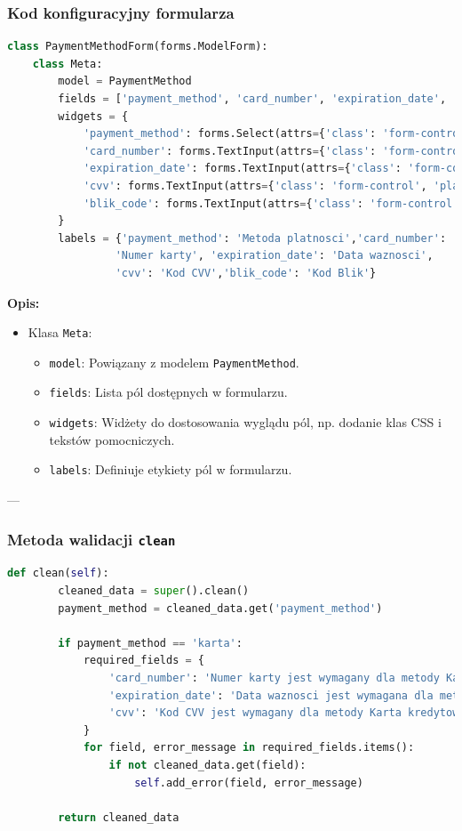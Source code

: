 \documentclass[12pt,a4paper,oneside]{article}
\theoremstyle{definition}
\numberwithin{equation}{section}
\begin{document}
\subsubsection*{Kod konfiguracyjny formularza}
\begin{lstlisting}[language=Python, caption=Konfiguracja formularza]
class PaymentMethodForm(forms.ModelForm):
    class Meta:
        model = PaymentMethod
        fields = ['payment_method', 'card_number', 'expiration_date', 'cvv', 'blik_code']
        widgets = {
            'payment_method': forms.Select(attrs={'class': 'form-control'}),
            'card_number': forms.TextInput(attrs={'class': 'form-control', 'placeholder': 'Wprowadz numer karty'}),
            'expiration_date': forms.TextInput(attrs={'class': 'form-control', 'placeholder': 'MM/RR'}),
            'cvv': forms.TextInput(attrs={'class': 'form-control', 'placeholder': 'CVV'}),
            'blik_code': forms.TextInput(attrs={'class': 'form-control', 'placeholder': 'Kod Blik'}),
        }
        labels = {'payment_method': 'Metoda platnosci','card_number': 
                 'Numer karty', 'expiration_date': 'Data waznosci',
                 'cvv': 'Kod CVV','blik_code': 'Kod Blik'}
\end{lstlisting}

\textbf{Opis:}  
\begin{itemize}
    \item Klasa \texttt{Meta}:
    \begin{itemize}
        \item \texttt{model}: Powiązany z modelem \texttt{PaymentMethod}.
        \item \texttt{fields}: Lista pól dostępnych w formularzu.
        \item \texttt{widgets}: Widżety do dostosowania wyglądu pól, np. dodanie klas CSS i tekstów pomocniczych.
        \item \texttt{labels}: Definiuje etykiety pól w formularzu.
    \end{itemize}
\end{itemize}

---

\subsubsection*{Metoda walidacji \texttt{clean}}
\begin{lstlisting}[language=Python, caption=Metoda walidacji clean w PaymentMethodForm]
    def clean(self):
        cleaned_data = super().clean()
        payment_method = cleaned_data.get('payment_method')

        if payment_method == 'karta':
            required_fields = {
                'card_number': 'Numer karty jest wymagany dla metody Karta kredytowa/debetowa.',
                'expiration_date': 'Data waznosci jest wymagana dla metody Karta kredytowa/debetowa.',
                'cvv': 'Kod CVV jest wymagany dla metody Karta kredytowa/debetowa.',
            }
            for field, error_message in required_fields.items():
                if not cleaned_data.get(field):
                    self.add_error(field, error_message)

        return cleaned_data
\end{lstlisting}
\end{document}
